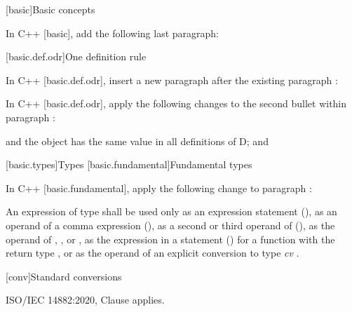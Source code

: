 
[basic]{Basic concepts}

\pnum
In C++ [basic], add the following last paragraph:

\begin{std.txt}
\end{std.txt}



\setcounter{section}{1}
[basic.def.odr]{One definition rule}

\pnum
In C++ [basic.def.odr], insert a new paragraph after the existing paragraph :

\begin{std.txt}
\end{std.txt}

\pnum
In C++ [basic.def.odr], apply the following changes to the second bullet within paragraph :

\begin{std.txt}
and the object has the same value in all definitions of D; and
\end{std.txt}

\setcounter{section}{8}
[basic.types]{Types}
[basic.fundamental]{Fundamental types}

\pnum
In C++ [basic.fundamental], apply the following change to paragraph :

\begin{std.txt}
An expression of type  shall be used only as an expression
statement (), as an operand of a comma expression
(), as a second or
third operand of  (), as the operand of ,
,  or , as the
expression in a  statement () for a function with the return type
, or as the operand of an explicit conversion to type
\emph{cv} .
\end{std.txt}

[conv]{Standard conversions}

ISO/IEC 14882:2020, Clause \the\value{chapter} applies.
